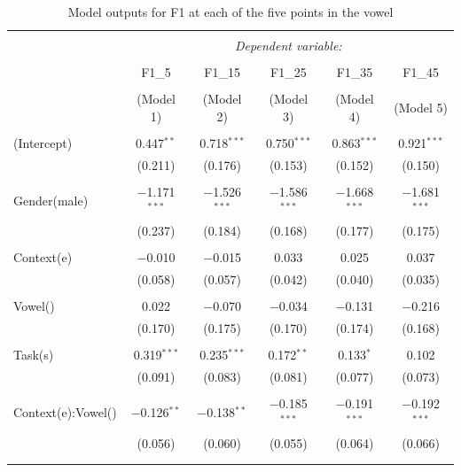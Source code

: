 \documentclass[12 pt]{article}
\begin{document}
\newpage
\begin{table}[htbp] %
	\caption{Model outputs for F1 at each of the five points in the vowel} 
	\label{table_f1_fixed_effects} 
	\begin{tabular}{@{\extracolsep{5pt}}lccccc} 
		\\[-1.8ex]\hline 
		\hline \\[-1.8ex] 
		& \multicolumn{5}{c}{\textit{Dependent variable:}} \\ 
		\cline{2-6} 
		\\[-1.8ex] & F1\_5 & F1\_15 & F1\_25 & F1\_35 & F1\_45 \\ 
		\\[-1.8ex] & (Model 1) & (Model 2) & (Model 3) & (Model 4) & (Model 5)\\ 
		\hline \\[-1.8ex] 
		(Intercept) & 0.447$^{**}$ & 0.718$^{***}$ & 0.750$^{***}$ & 0.863$^{***}$ & 0.921$^{***}$ \\ 
		& (0.211) & (0.176) & (0.153) & (0.152) & (0.150) \\ 
		& & & & & \\ 
		Gender(male) & $-$1.171$^{***}$ & $-$1.526$^{***}$ & $-$1.586$^{***}$ & $-$1.668$^{***}$ & $-$1.681$^{***}$ \\ 
		& (0.237) & (0.184) & (0.168) & (0.177) & (0.175) \\ 
		& & & & & \\ 
		Context(e) & $-$0.010 & $-$0.015 & 0.033 & 0.025 & 0.037 \\ 
		& (0.058) & (0.057) & (0.042) & (0.040) & (0.035) \\ 
		& & & & & \\ 
		Vowel(\textipa{2}) & 0.022 & $-$0.070 & $-$0.034 & $-$0.131 & $-$0.216 \\ 
		& (0.170) & (0.175) & (0.170) & (0.174) & (0.168) \\ 
		& & & & & \\ 
		Task(s) & 0.319$^{***}$ & 0.235$^{***}$ & 0.172$^{**}$ & 0.133$^{*}$ & 0.102 \\ 
		& (0.091) & (0.083) & (0.081) & (0.077) & (0.073) \\ 
		& & & & & \\ 
		Context(e):Vowel(\textipa{2}) & $-$0.126$^{**}$ & $-$0.138$^{**}$ & $-$0.185$^{***}$ & $-$0.191$^{***}$ & $-$0.192$^{***}$ \\ 
		& (0.056) & (0.060) & (0.055) & (0.064) & (0.066) \\ 
		& & & & & \\ 
		\hline \\[-1.8ex] 

\end{tabular}
\end{table}
\end{document}

